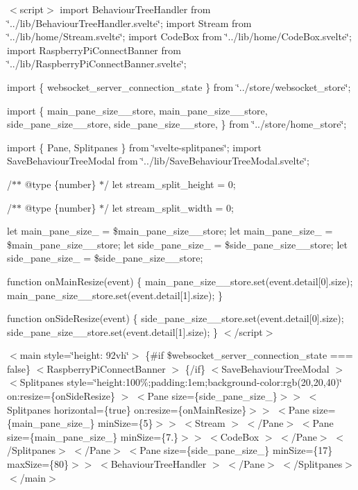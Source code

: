 $<$script$>$ import Behaviour\+Tree\+Handler from \char`\"{}../lib/\+Behaviour\+Tree\+Handler.\+svelte\char`\"{}; import Stream from \char`\"{}../lib/home/\+Stream.\+svelte\char`\"{}; import Code\+Box from \char`\"{}../lib/home/\+Code\+Box.\+svelte\char`\"{}; import Raspberry\+Pi\+Connect\+Banner from \char`\"{}../lib/\+Raspberry\+Pi\+Connect\+Banner.\+svelte\char`\"{};

import \{ websocket\+\_\+server\+\_\+connection\+\_\+state \} from \char`\"{}../store/websocket\+\_\+store\char`\"{};

import \{ main\+\_\+pane\+\_\+size\+\_\+\_\+store, main\+\_\+pane\+\_\+size\+\_\+\_\+store, side\+\_\+pane\+\_\+size\+\_\+\_\+store, side\+\_\+pane\+\_\+size\+\_\+\_\+store, \} from \char`\"{}../store/home\+\_\+store\char`\"{};

import \{ Pane, Splitpanes \} from \char`\"{}svelte-\/splitpanes\char`\"{}; import Save\+Behaviour\+Tree\+Modal from \char`\"{}../lib/\+Save\+Behaviour\+Tree\+Modal.\+svelte\char`\"{};

/$\ast$$\ast$ @type \{number\} $\ast$/ let stream\+\_\+split\+\_\+height = 0;

/$\ast$$\ast$ @type \{number\} $\ast$/ let stream\+\_\+split\+\_\+width = 0;

let main\+\_\+pane\+\_\+size\+\_ = \$main\+\_\+pane\+\_\+size\+\_\+\_\+store; let main\+\_\+pane\+\_\+size\+\_ = \$main\+\_\+pane\+\_\+size\+\_\+\_\+store; let side\+\_\+pane\+\_\+size\+\_ = \$side\+\_\+pane\+\_\+size\+\_\+\_\+store; let side\+\_\+pane\+\_\+size\+\_ = \$side\+\_\+pane\+\_\+size\+\_\+\_\+store;

function on\+Main\+Resize(event) \{ main\+\_\+pane\+\_\+size\+\_\+\_\+store.\+set(event.\+detail\mbox{[}0\mbox{]}.size); main\+\_\+pane\+\_\+size\+\_\+\_\+store.\+set(event.\+detail\mbox{[}1\mbox{]}.size); \}

function on\+Side\+Resize(event) \{ side\+\_\+pane\+\_\+size\+\_\+\_\+store.\+set(event.\+detail\mbox{[}0\mbox{]}.size); side\+\_\+pane\+\_\+size\+\_\+\_\+store.\+set(event.\+detail\mbox{[}1\mbox{]}.size); \} $<$/script$>$

$<$main style=\char`\"{}height\+: 92vh\char`\"{}$>$ \{\#if \$websocket\+\_\+server\+\_\+connection\+\_\+state === false\} $<$\+Raspberry\+Pi\+Connect\+Banner $>$ \{/if\} $<$\+Save\+Behaviour\+Tree\+Modal $>$ $<$\+Splitpanes         style=\char`\"{}height\+:100\%;padding\+:1em;background-\/color\+:rgb(20,20,40)\char`\"{}         on\+:resize=\{on\+Side\+Resize\}     $>$ $<$\+Pane size=\{side\+\_\+pane\+\_\+size\+\_\}$>$$>$ $<$\+Splitpanes horizontal=\{true\} on\+:resize=\{on\+Main\+Resize\}$>$$>$ $<$\+Pane size=\{main\+\_\+pane\+\_\+size\+\_\} min\+Size=\{5\}$>$$>$  $<$\+Stream $>$  $<$/\+Pane$>$ $<$\+Pane size=\{main\+\_\+pane\+\_\+size\+\_\} min\+Size=\{7.\}$>$$>$  $<$\+Code\+Box $>$  $<$/\+Pane$>$ $<$/\+Splitpanes$>$ $<$/\+Pane$>$ $<$\+Pane size=\{side\+\_\+pane\+\_\+size\+\_\} min\+Size=\{17\} max\+Size=\{80\}$>$$>$ $<$\+Behaviour\+Tree\+Handler $>$ $<$/\+Pane$>$ $<$/\+Splitpanes$>$ $<$/main$>$ 